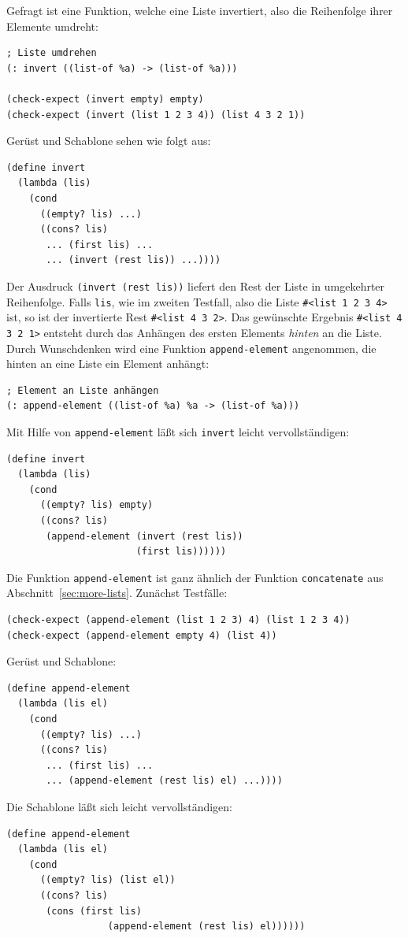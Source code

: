Gefragt ist eine Funktion, welche eine Liste invertiert, also die
Reihenfolge ihrer Elemente umdreht:\label{sec:invert}
%
\begin{verbatim}
; Liste umdrehen
(: invert ((list-of %a) -> (list-of %a)))

(check-expect (invert empty) empty)
(check-expect (invert (list 1 2 3 4)) (list 4 3 2 1))
\end{verbatim}
%
Gerüst und Schablone sehen wie folgt aus:
%
\begin{verbatim}
(define invert
  (lambda (lis)
    (cond
      ((empty? lis) ...)
      ((cons? lis)
       ... (first lis) ...
       ... (invert (rest lis)) ...))))
\end{verbatim}
%
Der Ausdruck \texttt{(invert (rest lis))} liefert den Rest der Liste
in umgekehrter Reihenfolge.  Falls \texttt{lis}, wie im zweiten
Testfall, also die Liste \verb|#<list 1 2 3 4>| ist, so ist der
invertierte Rest \verb|#<list 4 3 2>|.  Das gewünschte Ergebnis
\verb|#<list 4 3 2 1>| entsteht durch das Anhängen des ersten Elements
\emph{hinten} an die Liste.  Durch Wunschdenken wird eine Funktion
\texttt{append-element}
angenommen, die hinten an eine Liste ein Element anhängt:
%
\begin{verbatim}
; Element an Liste anhängen
(: append-element ((list-of %a) %a -> (list-of %a)))
\end{verbatim}
%
Mit Hilfe von \texttt{append-element} läßt sich \texttt{invert} leicht
vervollständigen:
%
\begin{verbatim}
(define invert
  (lambda (lis)
    (cond
      ((empty? lis) empty)
      ((cons? lis)
       (append-element (invert (rest lis))
                       (first lis))))))
\end{verbatim}
%
Die Funktion \texttt{append-element} ist ganz ähnlich der Funktion
\texttt{concatenate} aus Abschnitt~\ref{sec:more-lists}.  Zunächst
Testfälle:
%
\begin{verbatim}
(check-expect (append-element (list 1 2 3) 4) (list 1 2 3 4))
(check-expect (append-element empty 4) (list 4))
\end{verbatim}
%
Gerüst und Schablone:
%
\begin{verbatim}
(define append-element
  (lambda (lis el)
    (cond
      ((empty? lis) ...)
      ((cons? lis)
       ... (first lis) ...
       ... (append-element (rest lis) el) ...))))
\end{verbatim}
%
Die Schablone läßt sich leicht vervollständigen:
%
\begin{verbatim}
(define append-element
  (lambda (lis el)
    (cond
      ((empty? lis) (list el))
      ((cons? lis)
       (cons (first lis)
                  (append-element (rest lis) el))))))
\end{verbatim}
